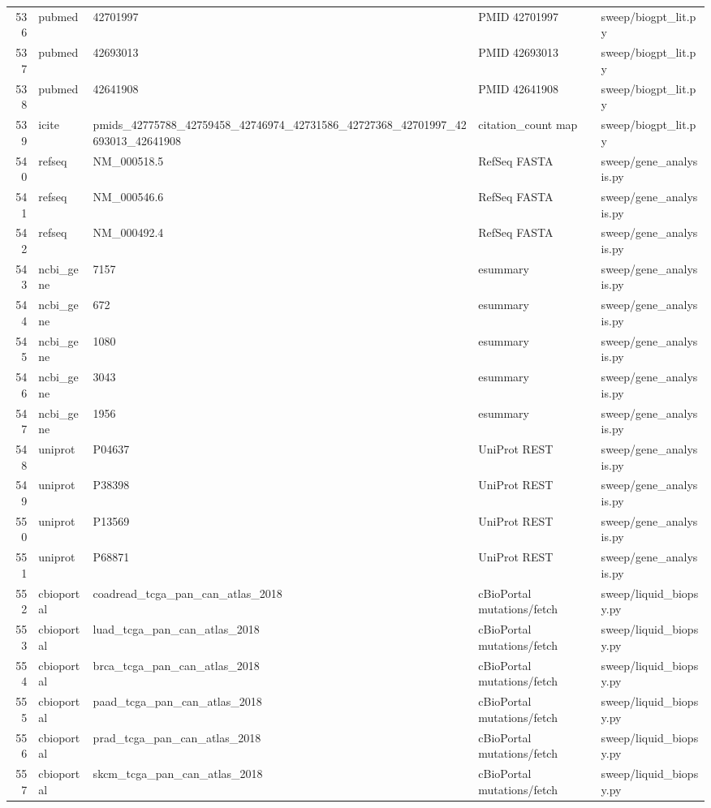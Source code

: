 {\begin{longtable}{rllp{3.2cm}p{4.2cm}}
536 & pubmed & 42701997 & PMID 42701997 & sweep/biogpt\_lit.py\\
537 & pubmed & 42693013 & PMID 42693013 & sweep/biogpt\_lit.py\\
538 & pubmed & 42641908 & PMID 42641908 & sweep/biogpt\_lit.py\\
539 & icite & pmids\_42775788\_42759458\_42746974\_42731586\_42727368\_42701997\_42693013\_42641908 & citation\_count map & sweep/biogpt\_lit.py\\
540 & refseq & NM\_000518.5 & RefSeq FASTA & sweep/gene\_analysis.py\\
541 & refseq & NM\_000546.6 & RefSeq FASTA & sweep/gene\_analysis.py\\
542 & refseq & NM\_000492.4 & RefSeq FASTA & sweep/gene\_analysis.py\\
543 & ncbi\_gene & 7157 & esummary & sweep/gene\_analysis.py\\
544 & ncbi\_gene & 672 & esummary & sweep/gene\_analysis.py\\
545 & ncbi\_gene & 1080 & esummary & sweep/gene\_analysis.py\\
546 & ncbi\_gene & 3043 & esummary & sweep/gene\_analysis.py\\
547 & ncbi\_gene & 1956 & esummary & sweep/gene\_analysis.py\\
548 & uniprot & P04637 & UniProt REST & sweep/gene\_analysis.py\\
549 & uniprot & P38398 & UniProt REST & sweep/gene\_analysis.py\\
550 & uniprot & P13569 & UniProt REST & sweep/gene\_analysis.py\\
551 & uniprot & P68871 & UniProt REST & sweep/gene\_analysis.py\\
552 & cbioportal & coadread\_tcga\_pan\_can\_atlas\_2018 & cBioPortal mutations/fetch & sweep/liquid\_biopsy.py\\
553 & cbioportal & luad\_tcga\_pan\_can\_atlas\_2018 & cBioPortal mutations/fetch & sweep/liquid\_biopsy.py\\
554 & cbioportal & brca\_tcga\_pan\_can\_atlas\_2018 & cBioPortal mutations/fetch & sweep/liquid\_biopsy.py\\
555 & cbioportal & paad\_tcga\_pan\_can\_atlas\_2018 & cBioPortal mutations/fetch & sweep/liquid\_biopsy.py\\
556 & cbioportal & prad\_tcga\_pan\_can\_atlas\_2018 & cBioPortal mutations/fetch & sweep/liquid\_biopsy.py\\
557 & cbioportal & skcm\_tcga\_pan\_can\_atlas\_2018 & cBioPortal mutations/fetch & sweep/liquid\_biopsy.py\\

\end{longtable}}
